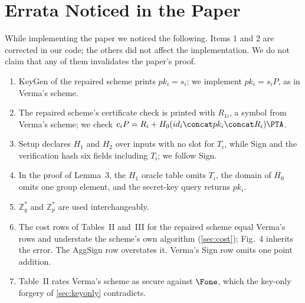 \section{Errata Noticed in the Paper}\label{app:errata}

While implementing the paper we noticed the following. Items 1 and 2 are corrected in our code; the
others did not affect the implementation. We do not claim that any of them invalidates the paper's proof.

\begin{enumerate}[itemsep=0pt]
\item \textsf{KeyGen} of the repaired scheme prints $pk_i=s_i$; we implement $pk_i=s_iP$, as in Verma's
      scheme.
\item The repaired scheme's certificate check is printed with $R_{1i}$, a symbol from Verma's scheme; we
      check $c_iP=R_i+H_0(id_i\concat pk_i\concat R_i)\PTA$.
\item \textsf{Setup} declares $H_1$ and $H_2$ over inputs with no slot for $T_i$, while \textsf{Sign} and
      the verification hash six fields including $T_i$; we follow \textsf{Sign}.
\item In the proof of Lemma~3, the $H_1$ oracle table omits $T_i$, the domain of $H_0$ omits one group
      element, and the secret-key query returns $pk_i$.
\item $\mathbb{Z}_q^{*}$ and $\mathbb{Z}_p^{*}$ are used interchangeably.
\item The cost rows of Tables~II and~III for the repaired scheme equal Verma's rows and understate the
      scheme's own algorithm (\cref{sec:cost}); Fig.~4 inherits the error. The \textsf{AggSign} row
      overstates it. Verma's \textsf{Sign} row omits one point addition.
\item Table~II rates Verma's scheme as secure against $\Fone$, which the key-only forgery of
      \cref{sec:keyonly} contradicts.
\end{enumerate}
